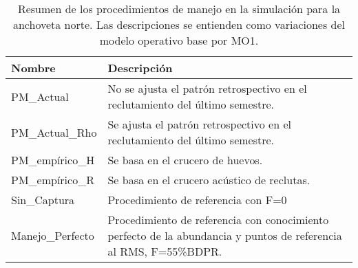 \begin{table}[h]
    \centering
    \caption{Resumen de los procedimientos de manejo en la simulación para la anchoveta norte. Las descripciones se entienden como variaciones del modelo operativo base por MO1.}
    \label{tab:tabla3}
    \begin{tabular}{|p{3.5cm}|p{10cm}|}
        \hline
        \textbf{Nombre} & \textbf{Descripción} \\
        \hline
        PM\_Actual & No se ajusta el patrón retrospectivo en el reclutamiento del último semestre.\\
        \hline
        PM\_Actual\_Rho & Se ajusta el patrón retrospectivo en el reclutamiento del último semestre.\\
        \hline
        PM\_empírico\_H & Se basa en el crucero de huevos. \\
        \hline
        PM\_empírico\_R & Se basa en el crucero acústico de reclutas. \\
        \hline
        Sin\_Captura & Procedimiento de referencia con F=0 \\
        \hline
        Manejo\_Perfecto & Procedimiento de referencia con conocimiento perfecto de la abundancia y puntos de referencia al RMS, F=55\%BDPR.\\
        \hline
    \end{tabular}
\end{table}


